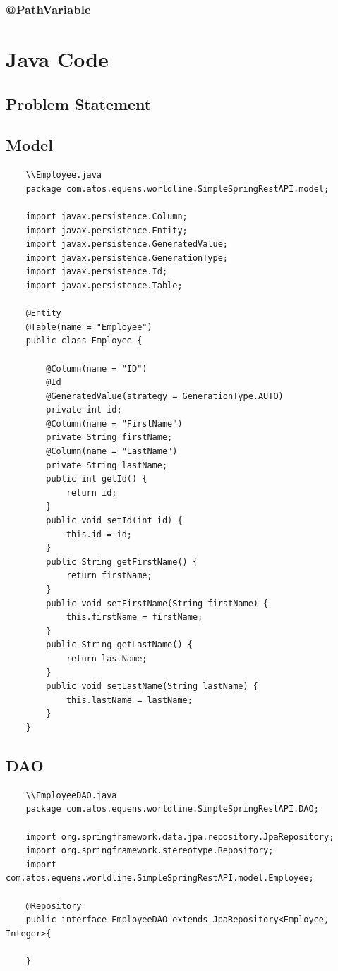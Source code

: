 \documentclass{report}
\begin{document}
	\subsubsection{@PathVariable}
	\section{Java Code}
	\subsection{Problem Statement}
	\subsection{Model}
	\begin{lstlisting}
	\\Employee.java
	package com.atos.equens.worldline.SimpleSpringRestAPI.model;
	
	import javax.persistence.Column;
	import javax.persistence.Entity;
	import javax.persistence.GeneratedValue;
	import javax.persistence.GenerationType;
	import javax.persistence.Id;
	import javax.persistence.Table;
	
	@Entity
	@Table(name = "Employee")
	public class Employee {
	
		@Column(name = "ID")
		@Id
		@GeneratedValue(strategy = GenerationType.AUTO)
		private int id;
		@Column(name = "FirstName")
		private String firstName;
		@Column(name = "LastName")
		private String lastName;
		public int getId() {
			return id;
		}
		public void setId(int id) {
			this.id = id;
		}
		public String getFirstName() {
			return firstName;
		}
		public void setFirstName(String firstName) {
			this.firstName = firstName;
		}
		public String getLastName() {
			return lastName;
		}
		public void setLastName(String lastName) {
			this.lastName = lastName;
		}		
	}
	\end{lstlisting}
	\subsection{DAO}
	\begin{lstlisting}
	\\EmployeeDAO.java
	package com.atos.equens.worldline.SimpleSpringRestAPI.DAO;
		
	import org.springframework.data.jpa.repository.JpaRepository;
	import org.springframework.stereotype.Repository;
	import com.atos.equens.worldline.SimpleSpringRestAPI.model.Employee;
		
	@Repository
	public interface EmployeeDAO extends JpaRepository<Employee, Integer>{

	}		
	\end{lstlisting}
\end{document}
